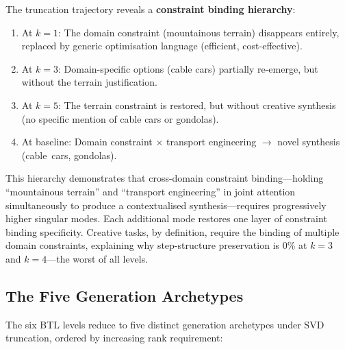 The truncation trajectory reveals a \textbf{constraint binding hierarchy}:
\begin{enumerate}
    \item At $k=1$: The domain constraint (mountainous terrain) disappears entirely,
          replaced by generic optimisation language (efficient, cost-effective).
    \item At $k=3$: Domain-specific options (cable cars) partially re-emerge,
          but without the terrain justification.
    \item At $k=5$: The terrain constraint is restored, but without creative synthesis
          (no specific mention of cable cars or gondolas).
    \item At baseline: Domain constraint $\times$ transport engineering $\to$ novel synthesis
          (cable~cars, gondolas).
\end{enumerate}

This hierarchy demonstrates that cross-domain constraint binding---holding ``mountainous terrain''
and ``transport engineering'' in joint attention simultaneously to produce a contextualised
synthesis---requires progressively higher singular modes.
Each additional mode restores one layer of constraint binding specificity.
Creative tasks, by definition, require the binding of multiple domain constraints, explaining
why step-structure preservation is 0\% at $k=3$ and $k=4$---the worst of all levels.

\subsection{The Five Generation Archetypes}

The six BTL levels reduce to five distinct generation archetypes under SVD truncation,
ordered by increasing rank requirement:

